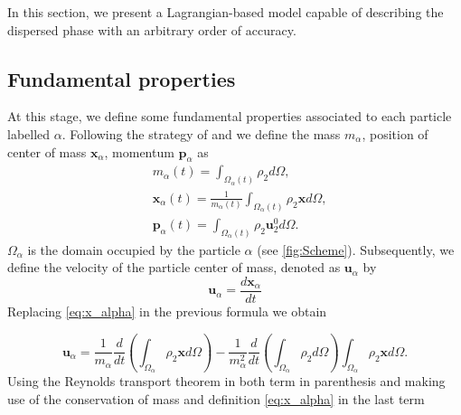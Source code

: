 
In this section, we present a Lagrangian-based model capable of describing the dispersed phase with an arbitrary order of accuracy.

\subsection{Fundamental properties}

At this stage, we define some fundamental properties associated to each particle labelled $\alpha$.
Following the strategy of \citet{lhuillier2009rheology,lhuillier1992volume,zaepffel2011modelisation} and \citet[Chapter 2]{morel2015mathematical}
we define the mass $m_\alpha$, position of center of mass $\mathbf{x}_\alpha$, momentum $\textbf{p}_\alpha$ as %
\begin{align}
    &m_\alpha(t)
    = \int_{\Omega_\alpha(t)} \rho_2  d\Omega, \\
    &\textbf{x}_\alpha(t)
    = \frac{1}{m_\alpha(t) }\int_{\Omega_\alpha(t)} \rho_2 \textbf{x} d\Omega, \label{eq:x_alpha}\\
    &\textbf{p}_\alpha(t) 
    = \int_{\Omega_\alpha(t)} \rho_2 \textbf{u}_2^0 d\Omega.
\end{align}
 $\Omega_\alpha$ is the domain occupied by the particle $\alpha$ (see \ref{fig:Scheme}). 
Subsequently, we define the velocity of the particle center of mass, denoted as $\textbf{u}_\alpha$ by 
\begin{equation}
\textbf{u}_\alpha = \frac{d \textbf{x}_\alpha}{dt}  
\end{equation}
Replacing \eqref{eq:x_alpha} in the previous formula we obtain

\begin{equation}
    \textbf{u}_\alpha = \frac{1}{m_\alpha}
    \frac{d}{dt} 
    \left(
        \int_{\Omega_\alpha} \rho_2 \textbf{x} d\Omega
    \right)
    - \frac{1}{m_\alpha^2} \frac{d}{dt} \left(\int_{\Omega_\alpha} \rho_2 d\Omega \right)\int_{\Omega_\alpha} \rho_2 \textbf{x} d\Omega.
\end{equation}
Using the Reynolds transport theorem in both term in parenthesis and making use of the conservation of mass and definition \eqref{eq:x_alpha} in the last term

